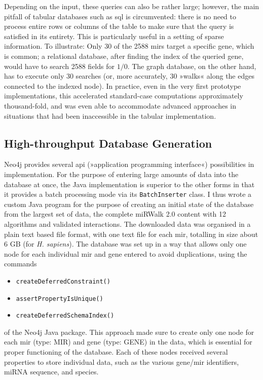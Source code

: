 Depending on the input, these queries can also be rather large; however, the main pitfall of tabular databases such as \ac{sql} is circumvented: there is no need to process entire rows or columns of the table to make sure that the query is satisfied in its entirety. This is particularly useful in a setting of sparse information. To illustrate: Only 30 of the 2588 \acp{mir} target a specific gene, which is common; a relational database, after finding the index of the queried gene, would have to search 2588 fields for $1/0$. The graph database, on the other hand, has to execute only 30 searches (or, more accurately, 30 »walks« along the edges connected to the indexed node). In practice, even in the very first prototype implementations, this accelerated standard-case computations approximately thousand-fold, and was even able to accommodate advanced approaches in situations that had been inaccessible in the tabular implementation.

\subsection{High-throughput Database Generation}
Neo4j provides several \acs{api} (»application programming interface«) possibilities in implementation. For the purpose of entering large amounts of data into the database at once, the Java implementation is superior to the other forms in that it provides a batch processing mode via its \texttt{BatchInserter} class. I thus wrote a custom Java program for the purpose of creating an initial state of the database from the largest set of data, the complete miRWalk 2.0 content with 12 algorithms and validated interactions. The downloaded data was organised in a plain text based file format, with one text file for each \ac{mir}, totalling in size about 6 GB (for \textit{H. sapiens}). The database was set up in a way that allows only one node for each individual \ac{mir} and gene entered to avoid duplications, using the commands 
\begin{itemize}[noitemsep, leftmargin=.5cm, label={\tiny\raisebox{1ex}{\textbullet}}]
\item \texttt{createDeferredConstraint()}
\item \texttt{assertPropertyIsUnique()}
\item \texttt{createDeferredSchemaIndex()} 
\end{itemize}
of the Neo4j Java package. This approach made sure to create only one node for each \ac{mir} (type: MIR) and gene (type: GENE) in the data, which is essential for proper functioning of the database. Each of these nodes received several properties to store individual data, such as the various gene/\ac{mir} identifiers, miRNA sequence, and species. 

